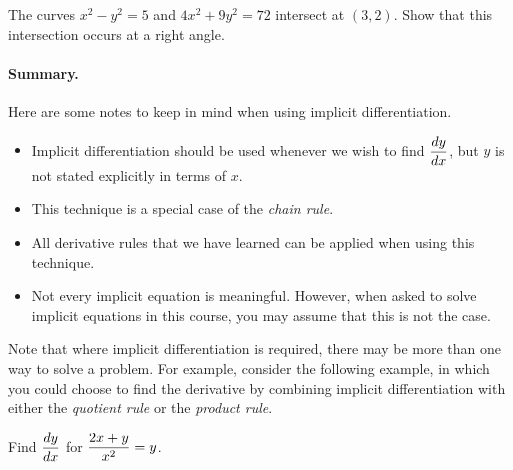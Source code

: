\documentclass[12pt]{article}
\begin{document}
\vspace{60mm}

\Example The curves $x^2-y^2=5$ and $4x^2+9y^2=72$ intersect at $(3,2)$. Show that this intersection occurs at a right angle.

\vspace{60mm}


\vspace{3mm}

\paragraph{Summary.} Here are some notes to keep in mind when using implicit differentiation.
\begin{itemize}
	\item Implicit differentiation should be used whenever we wish to find $\displaystyle\frac{dy}{dx}$, but $y$ is not stated explicitly in terms of $x$.
	\item This technique is a special case of the \textit{chain rule}.
	\item All derivative rules that we have learned can be applied when using this technique.
	\item Not every implicit equation is meaningful.   However, when asked to solve implicit equations in this course, you may assume that this is not the case.
\end{itemize}

\newpage 

Note that where implicit differentiation is required, there may be more than one way to solve a problem. For example, consider the following example, in which you could choose to find the derivative by combining implicit differentiation with either the \textit{quotient rule} or the \textit{product rule}.

\Example Find $\displaystyle\frac{dy}{dx}$ for $\displaystyle\frac{2x+y}{x^2}=y$.
\end{document}
